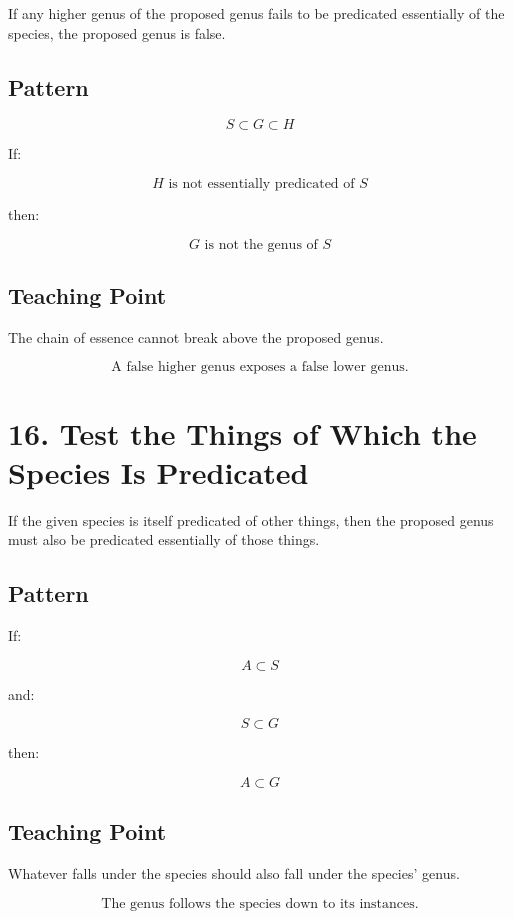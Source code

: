 \documentclass[12pt]{article}
\begin{document}
If any higher genus of the proposed genus fails to be predicated essentially of
the species, the proposed genus is false.

\subsection*{Pattern}

\[
S \subset G \subset H
\]

If:

\[
H \text{ is not essentially predicated of } S
\]

then:

\[
G \text{ is not the genus of } S
\]

\subsection*{Teaching Point}

The chain of essence cannot break above the proposed genus.

\[
\boxed{
\text{A false higher genus exposes a false lower genus.}
}
\]

\section*{16. Test the Things of Which the Species Is Predicated}

If the given species is itself predicated of other things, then the proposed
genus must also be predicated essentially of those things.

\subsection*{Pattern}

If:

\[
A \subset S
\]

and:

\[
S \subset G
\]

then:

\[
A \subset G
\]

\subsection*{Teaching Point}

Whatever falls under the species should also fall under the species' genus.

\[
\boxed{
\text{The genus follows the species down to its instances.}
}
\]
\end{document}

